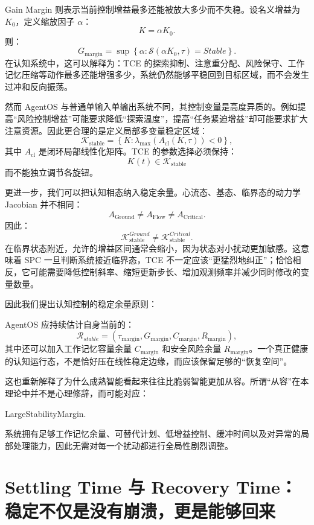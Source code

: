 Gain Margin 则表示当前控制增益最多还能被放大多少而不失稳。设名义增益为 $K_0$，定义缩放因子 $\alpha$：
\[
K=\alpha K_0.
\]
则：
\[
G_{\mathrm{margin}}
=
\sup
\left\{
\alpha:
\mathcal S(\alpha K_0,\tau)=Stable
\right\}.
\]
在认知系统中，这可以解释为：TCE 的探索抑制、注意重分配、风险保守、工作记忆压缩等动作最多还能增强多少，系统仍然能够平稳回到目标区域，而不会发生过冲和反向振荡。

然而 AgentOS 与普通单输入单输出系统不同，其控制变量是高度异质的。例如提高“风险控制增益”可能要求降低“探索温度”，提高“任务紧迫增益”却可能要求扩大注意资源。因此更合理的是定义局部多变量稳定区域：
\[
\mathcal K_{\mathrm{stable}}
=
\left\{
K:
\lambda_{\max}
\left(
A_{\mathrm{cl}}(K,\tau)
\right)
<0
\right\},
\]
其中 $A_{\mathrm{cl}}$ 是闭环局部线性化矩阵。TCE 的参数选择必须保持：
\[
K(t)\in\mathcal K_{\mathrm{stable}}
\]
而不能独立调节各旋钮。

更进一步，我们可以把认知相态纳入稳定余量。心流态、基态、临界态的动力学 Jacobian 并不相同：
\[
A_{\mathrm{Ground}}
\neq
A_{\mathrm{Flow}}
\neq
A_{\mathrm{Critical}}.
\]
因此：
\[
\mathcal K_{\mathrm{stable}}^{Ground}
\neq
\mathcal K_{\mathrm{stable}}^{Critical}.
\]
在临界状态附近，允许的增益区间通常会缩小，因为状态对小扰动更加敏感。这意味着 SPC 一旦判断系统接近临界态，TCE 不一定应该“更猛烈地纠正”；恰恰相反，它可能需要降低控制斜率、缩短更新步长、增加观测频率并减少同时修改的变量数量。

因此我们提出认知控制的稳定余量原则：
\begin{statementbox}
\centering
{}
\end{statementbox}
AgentOS 应持续估计自身当前的：
\[
\mathcal R_{stable}
=
\left(
\tau_{\mathrm{margin}},
G_{\mathrm{margin}},
C_{\mathrm{margin}},
R_{\mathrm{margin}}
\right),
\]
其中还可以加入工作记忆容量余量 $C_{\mathrm{margin}}$ 和安全风险余量 $R_{\mathrm{margin}}$。一个真正健康的认知运行态，不是恰好压在线性稳定边缘，而应该保留足够的“恢复空间”。

这也重新解释了为什么成熟智能看起来往往比脆弱智能更加从容。所谓“从容”在本理论中并不是心理修辞，而可能对应：
\begin{statementbox}
LargeStabilityMargin.
\end{statementbox}
系统拥有足够工作记忆余量、可替代计划、低增益控制、缓冲时间以及对异常的局部处理能力，因此无需对每一个扰动都进行全局性剧烈调整。

\section{Settling Time 与 Recovery Time：稳定不仅是没有崩溃，更是能够回来}


